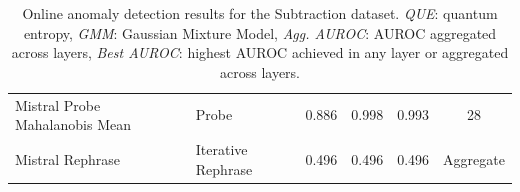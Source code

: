 \begin{table}[H]
\begin{tabular}{lp{3cm}lccc}
Mistral Probe Mahalanobis Mean    & Probe       & 0.886  & 0.998  & 0.993  & 28 \\ 
Mistral Rephrase                  & Iterative Rephrase & 0.496  & 0.496  & 0.496  & Aggregate \\ 
\bottomrule
\end{tabular}
\caption{Online anomaly detection results for the Subtraction dataset. \emph{QUE}: quantum entropy, \emph{GMM}: Gaussian Mixture Model, \emph{Agg. AUROC}: AUROC aggregated across layers, \emph{Best AUROC}: highest AUROC achieved in any layer or aggregated across layers.}
\label{tab:online_anomaly_subtraction}
\end{table}

